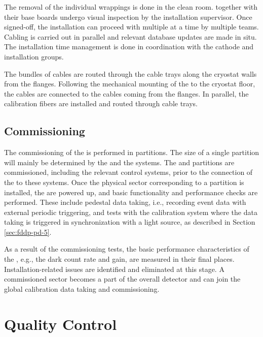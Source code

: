 The removal of the individual  wrappings is done in the clean room.  together with their base boards undergo visual inspection by the  installation supervisor. Once signed-off, the installation can proceed with multiple  at a time by multiple teams. Cabling is carried out in parallel and relevant database updates are made in situ. The installation time management is done in coordination with the cathode and  installation groups.

The bundles of cables are routed through the cable trays along the cryostat walls from the  flanges. Following the mechanical mounting of the  to the cryostat floor, the  cables are 
connected to the cables coming from the flanges. In parallel, the calibration fibers are installed and routed through cable trays.

\subsection{Commissioning}
\label{sec:fddp-pd-9.4}

The commissioning of the  is performed in partitions. The size of a single partition will mainly be determined by the  and the  systems. The  and  partitions are commissioned, including the relevant control systems, prior to the connection of the  to these systems. Once the physical sector corresponding to a partition is installed, the  are powered up, and basic functionality and performance checks are performed. These include pedestal data taking, i.e., recording event data with external periodic triggering, and tests with the calibration system where the data taking is triggered in synchronization with a light source, as described in Section \ref{sec:fddp-pd-5}.

As a result of the commissioning tests, the basic performance characteristics of the , e.g., the dark count rate and gain, are measured in their final places. Installation-related issues are identified and eliminated at this stage. A commissioned sector %
becomes a part of the overall detector and can join the global calibration data taking and commissioning.

\section{Quality Control}
\label{sec:fddp-pd-10}


